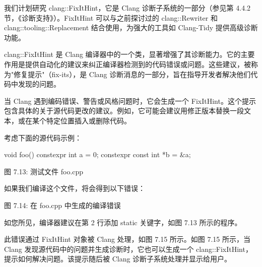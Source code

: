 我们计划研究 clang::FixItHint，它是 Clang 诊断子系统的一部分（参见第 4.4.2 节，《诊断支持》）。FixItHint 可以与之前探讨过的 clang::Rewriter 和 clang::tooling::Replacement 结合使用，为强大的工具如 Clang-Tidy 提供高级诊断功能。


clang::FixItHint 是 Clang 编译器中的一个类，显著增强了其诊断能力。它的主要作用是提供自动化的建议来纠正编译器检测到的代码错误或问题。这些建议，被称为"修复提示"（fix-its），是 Clang 诊断消息的一部分，旨在指导开发者解决他们代码中发现的问题。

当 Clang 遇到编码错误、警告或风格问题时，它会生成一个 FixItHint。这个提示包含具体的关于源代码更改的建议。例如，它可能会建议用修正版本替换一段文本，或在某个特定位置插入或删除代码。

考虑下面的源代码示例：

\begin{cpp}
void foo() {
  constexpr int a = 0;
  constexpr const int *b = &a;
}
\end{cpp}

\begin{center}
图 7.13: 测试文件 foo.cpp
\end{center}

如果我们编译这个文件，将会得到以下错误：


\begin{center}
图 7.14: 在 foo.cpp 中生成的编译错误
\end{center}

如您所见，编译器建议在第 2 行添加 static 关键字，如图 7.13 所示的程序。

此错误通过 FixItHint 对象被 Clang 处理，如图 7.15 所示。如图 7.15 所示，当 Clang 发现源代码中的问题并生成诊断时，它也可以生成一个 clang::FixItHint，提示如何解决问题。该提示随后被 Clang 诊断子系统处理并显示给用户。

